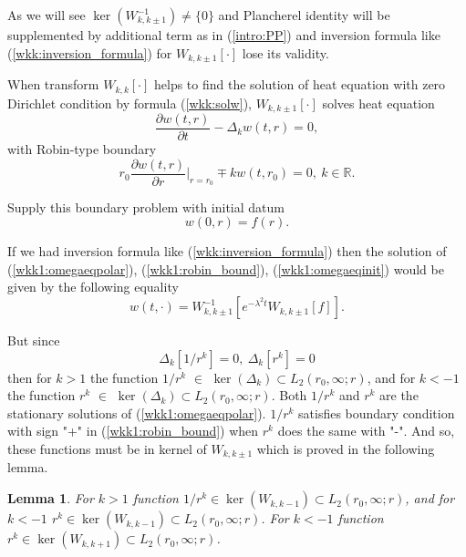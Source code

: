 \documentclass[manuscript, printscheme]{paper}
\newtheorem{lem}[thm]{Lemma}
\newcommand{\RM}{\mathbb{R}}
\begin{document}
As we will see $\ker(W^{-1}_{k,k\pm 1})\neq \{0\}$ and Plancherel identity will be supplemented by additional term  as in (\ref{intro:PP}) and inversion formula like (\ref{wkk:inversion_formula}) for $W_{k,k\pm 1}[\cdot]$ lose its validity.

When transform $W_{k,k}[\cdot]$ helps to find the solution of heat equation with zero Dirichlet condition by formula (\ref{wkk:solw}), $W_{k,k \pm 1}[\cdot]$ solves heat equation 
\begin{equation} \label{wkk1:omegaeqpolar}
\frac{\partial w(t,r)}{\partial t} - \Delta_k w(t,r) = 0,
\end{equation}
with Robin-type boundary
\begin{equation}\label{wkk1:robin_bound}
r_0\frac{\partial w(t,r)}{\partial r}\Big|_{r=r_0} \mp k w(t,r_0) = 0,~k \in \RM.
\end{equation}

Supply this boundary problem with initial datum \begin{equation} \label{wkk1:omegaeqinit}
w(0,r) = f(r).
\end{equation}

If we had inversion formula like (\ref{wkk:inversion_formula}) then the solution of (\ref{wkk1:omegaeqpolar}), (\ref{wkk1:robin_bound}), (\ref{wkk1:omegaeqinit}) would be given by the following equality
$$
w(t,\cdot) = W^{-1}_{k,k\pm 1}\left [ e^{-\lambda^2 t} W_{k,k\pm 1}[f] \right ].
$$

But since
$$
\Delta_k[1/r^k]=0,~\Delta_k[r^k]=0
$$
then for $k>1$ the function $1/r^k$ $\in$ $\ker(\Delta_k)\subset L_2(r_0,\infty; r)$, and for $k<-1$ the function $r^k$ $\in$ $\ker(\Delta_k) \subset L_2(r_0,\infty; r)$. Both $1/r^k$ and $r^k$
 are the stationary solutions of (\ref{wkk1:omegaeqpolar}). $1/r^k$ satisfies boundary condition with sign "+" in (\ref{wkk1:robin_bound}) when $r^k$ does the same with "-". And so, these functions must be in kernel of $W_{k,k\pm 1}$ which is proved in the following lemma. 

\begin{lem} \label{wkk1:lem1}For $k>1$ function $1/r^k \in \ker(W_{k,k-1}) \subset L_2(r_0,\infty; r)$, and
for $k<-1$ $r^k \in \ker(W_{k,k-1}) \subset L_2(r_0,\infty; r)$. For $k<-1$ function $r^k \in \ker(W_{k,k+1}) \subset L_2(r_0,\infty; r)$.
\end{lem}
\end{document}
